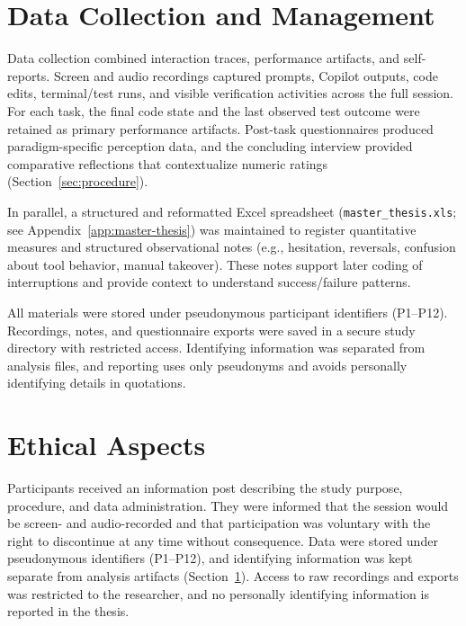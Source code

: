 \section{Data Collection and Management}
\label{sec:data-collection}

Data collection combined interaction traces, performance artifacts, and self-reports. Screen and audio recordings captured prompts, Copilot outputs, code edits, terminal/test runs, and visible verification activities across the full session. For each task, the final code state and the last observed test outcome were retained as primary performance artifacts. Post-task questionnaires produced paradigm-specific perception data, and the concluding interview provided comparative reflections that contextualize numeric ratings (Section~\ref{sec:procedure}).

In parallel, a structured and reformatted Excel spreadsheet (\texttt{master\_thesis.xls}; see Appendix~\ref{app:master-thesis}) was maintained to register quantitative measures and structured observational notes (e.g., hesitation, reversals, confusion about tool behavior, manual takeover). These notes support later coding of interruptions and provide context to understand success/failure patterns.

All materials were stored under pseudonymous participant identifiers (P1--P12). Recordings, notes, and questionnaire exports were saved in a secure study directory with restricted access. Identifying information was separated from analysis files, and reporting uses only pseudonyms and avoids personally identifying details in quotations.

\section{Ethical Aspects}
\label{sec:ethics}

Participants received an information post describing the study purpose, procedure, and data administration. They were informed that the session would be screen- and audio-recorded and that participation was voluntary with the right to discontinue at any time without consequence. Data were stored under pseudonymous identifiers (P1--P12), and identifying information was kept separate from analysis artifacts (Section~\ref{sec:data-collection}). Access to raw recordings and exports was restricted to the researcher, and no personally identifying information is reported in the thesis.
